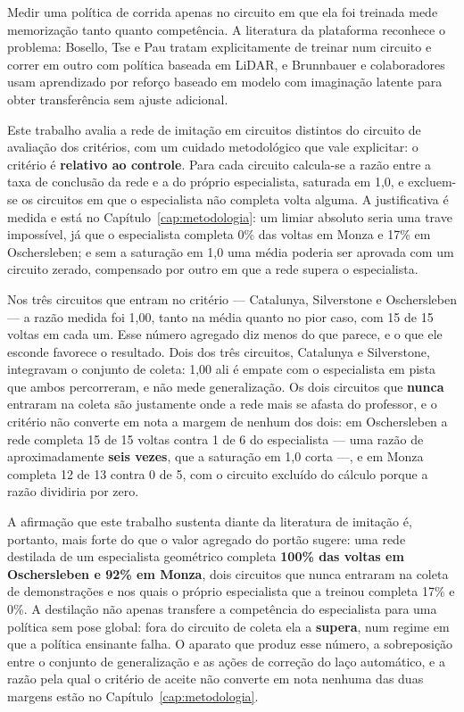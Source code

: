 Medir uma política de corrida apenas no circuito em que ela foi treinada mede
memorização tanto quanto competência. A literatura da plataforma reconhece o
problema: Bosello, Tse e Pau \cite{Bosello2022CrossTrack} tratam explicitamente
de treinar num circuito e correr em outro com política baseada em LiDAR, e
Brunnbauer e colaboradores \cite{Brunnbauer2022Latent} usam aprendizado por
reforço baseado em modelo com imaginação latente para obter transferência sem
ajuste adicional.

Este trabalho avalia a rede de imitação em circuitos distintos do circuito de
avaliação dos critérios, com um cuidado metodológico que vale explicitar: o
critério é \textbf{relativo ao controle}. Para cada circuito calcula-se a razão
entre a taxa de conclusão da rede e a do próprio especialista, saturada em 1,0, e
excluem-se os circuitos em que o especialista não completa volta alguma. A
justificativa é medida e está no Capítulo~\ref{cap:metodologia}: um limiar
absoluto seria uma trave impossível, já que o especialista completa 0\% das
voltas em Monza e 17\% em Oschersleben; e sem a saturação em 1,0 uma média
poderia ser aprovada com um circuito zerado, compensado por outro em que a rede
supera o especialista.

Nos três circuitos que entram no critério --- Catalunya, Silverstone e
Oschersleben --- a razão medida foi 1,00, tanto na média quanto no pior caso, com
15 de 15 voltas em cada um. Esse número agregado diz menos do que parece, e o que
ele esconde favorece o resultado. Dois dos três circuitos, Catalunya e
Silverstone, integravam o conjunto de coleta: 1,00 ali é empate com o
especialista em pista que ambos percorreram, e não mede generalização. Os dois
circuitos que \textbf{nunca} entraram na coleta são justamente onde a rede mais
se afasta do professor, e o critério não converte em nota a margem de nenhum dos
dois: em Oschersleben a rede completa 15 de 15 voltas contra 1 de 6 do
especialista --- uma razão de aproximadamente \textbf{seis vezes}, que a
saturação em 1,0 corta ---, e em Monza completa 12 de 13 contra 0 de 5, com o
circuito excluído do cálculo porque a razão dividiria por zero.

A afirmação que este trabalho sustenta diante da literatura de imitação é,
portanto, mais forte do que o valor agregado do portão sugere: uma rede destilada
de um especialista geométrico completa \textbf{100\% das voltas em Oschersleben e
92\% em Monza}, dois circuitos que nunca entraram na coleta de demonstrações e
nos quais o próprio especialista que a treinou completa 17\% e 0\%. A destilação
não apenas transfere a competência do especialista para uma política sem pose
global: fora do circuito de coleta ela a \textbf{supera}, num regime em que a
política ensinante falha. O aparato que produz esse número, a sobreposição entre
o conjunto de generalização e as ações de correção do laço automático, e a razão
pela qual o critério de aceite não converte em nota nenhuma das duas margens
estão no Capítulo~\ref{cap:metodologia}.

